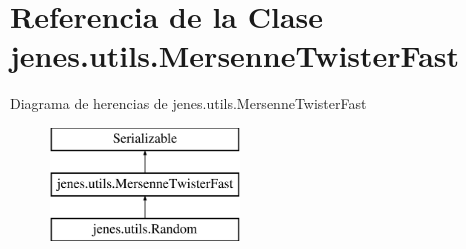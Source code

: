 \hypertarget{classjenes_1_1utils_1_1_mersenne_twister_fast}{\section{Referencia de la Clase jenes.\-utils.\-Mersenne\-Twister\-Fast}
\label{classjenes_1_1utils_1_1_mersenne_twister_fast}
}
Diagrama de herencias de jenes.\-utils.\-Mersenne\-Twister\-Fast\begin{figure}[H]
\begin{center}
\leavevmode
\includegraphics[height=3.000000cm]{classjenes_1_1utils_1_1_mersenne_twister_fast}
\end{center}
\end{figure}
